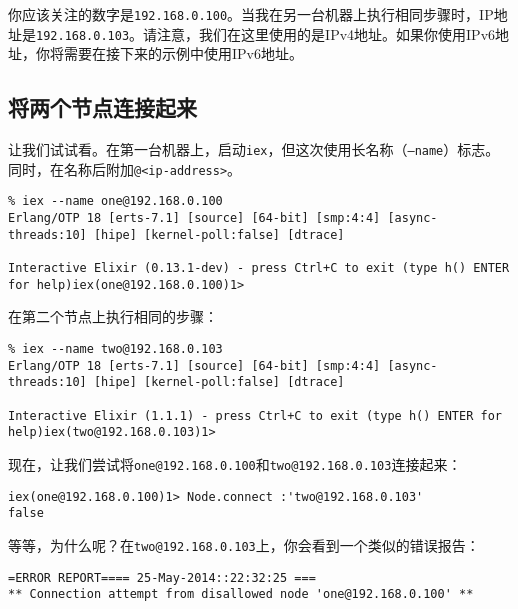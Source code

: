 你应该关注的数字是\texttt{192.168.0.100}。当我在另一台机器上执行相同步骤时，IP地址是\texttt{192.168.0.103}。请注意，我们在这里使用的是IPv4地址。如果你使用IPv6地址，你将需要在接下来的示例中使用IPv6地址。

\subsection{将两个节点连接起来}

让我们试试看。在第一台机器上，启动\texttt{iex}，但这次使用长名称（\texttt{--name}）标志。同时，在名称后附加\texttt{@<ip-address>}。

\begin{code}{}
\begin{verbatim}
% iex --name one@192.168.0.100
Erlang/OTP 18 [erts-7.1] [source] [64-bit] [smp:4:4] [async-threads:10] [hipe] [kernel-poll:false] [dtrace]

Interactive Elixir (0.13.1-dev) - press Ctrl+C to exit (type h() ENTER for help)iex(one@192.168.0.100)1>
\end{verbatim}
\end{code}

在第二个节点上执行相同的步骤：

\begin{code}{}
\begin{verbatim}
% iex --name two@192.168.0.103
Erlang/OTP 18 [erts-7.1] [source] [64-bit] [smp:4:4] [async-threads:10] [hipe] [kernel-poll:false] [dtrace]

Interactive Elixir (1.1.1) - press Ctrl+C to exit (type h() ENTER for help)iex(two@192.168.0.103)1>
\end{verbatim}
\end{code}

现在，让我们尝试将\texttt{one@192.168.0.100}和\texttt{two@192.168.0.103}连接起来：

\begin{code}{}
\begin{verbatim}
iex(one@192.168.0.100)1> Node.connect :'two@192.168.0.103'
false
\end{verbatim}
\end{code}

等等，为什么呢？在\texttt{two@192.168.0.103}上，你会看到一个类似的错误报告：

\begin{code}{}
\begin{verbatim}
=ERROR REPORT==== 25-May-2014::22:32:25 ===
** Connection attempt from disallowed node 'one@192.168.0.100' **
\end{verbatim}
\end{code}

